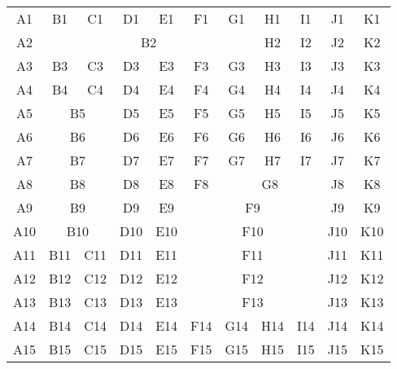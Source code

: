 \begin{tabular}{c|c|c|c|c|c|c|c|c|c|c|}
A1 & B1 & C1 & D1 & E1 & F1 & G1 & H1 & I1 & J1 & K1\\
A2 & \multicolumn{6}{c}{B2} & H2 & I2 & J2 & K2\\
A3 & B3 & C3 & D3 & E3 & F3 & G3 & H3 & I3 & J3 & K3\\
A4 & B4 & C4 & D4 & E4 & F4 & G4 & H4 & I4 & J4 & K4\\
A5 & \multicolumn{2}{c}{B5} & D5 & E5 & F5 & G5 & H5 & I5 & J5 & K5\\
A6 & \multicolumn{2}{c}{B6} & D6 & E6 & F6 & G6 & H6 & I6 & J6 & K6\\
A7 & \multicolumn{2}{c}{B7} & D7 & E7 & F7 & G7 & H7 & I7 & J7 & K7\\
A8 & \multicolumn{2}{c}{B8} & D8 & E8 & F8 & \multicolumn{3}{c}{G8} & J8 & K8\\
A9 & \multicolumn{2}{c}{B9} & D9 & E9 & \multicolumn{4}{c}{F9} & J9 & K9\\
A10 & \multicolumn{2}{c}{B10} & D10 & E10 & \multicolumn{4}{c}{F10} & J10 & K10\\
A11 & B11 & C11 & D11 & E11 & \multicolumn{4}{c}{F11} & J11 & K11\\
A12 & B12 & C12 & D12 & E12 & \multicolumn{4}{c}{F12} & J12 & K12\\
A13 & B13 & C13 & D13 & E13 & \multicolumn{4}{c}{F13} & J13 & K13\\
A14 & B14 & C14 & D14 & E14 & F14 & G14 & H14 & I14 & J14 & K14\\
A15 & B15 & C15 & D15 & E15 & F15 & G15 & H15 & I15 & J15 & K15
\end{tabular}